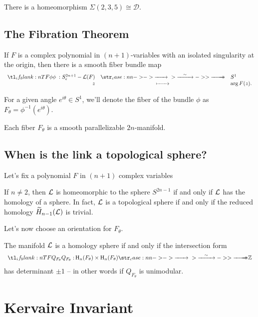 \begin{proposition}
	There is a homeomorphism $\Sigma(2,3,5)\cong \mathscr{D}$.
\end{proposition}

\subsection{The Fibration Theorem}

\begin{theorem}\label{thm:fibration}
	If $F$ is a complex polynomial in $(n+1)$-variables with an isolated singularity at the origin, then there is a smooth fiber bundle map
	\[
		\lkxfunc{\phi}{S^{2n+1}_\varepsilon - \L(F)}{S^1}{z}{\arg F(z).}
	\]
\end{theorem}

For a given angle $e^{i\theta}\in S^1$, we'll denote the fiber of the bundle $\phi$ as $F_\theta = \phi^{-1}(e^{i\theta})$.

\begin{proposition}
  Each fiber $F_\theta$ is a smooth parallelizable $2n$-manifold.
\end{proposition}

\subsection{When is the link a topological sphere?}

Let's fix a polynomial $F$ in $(n+1)$ complex variables

\begin{proposition}
  If $n\neq 2$, then $\mathcal{L}$ is homeomorphic to the sphere $S^{2n-1}$ if and only if $\mathcal{L}$ has the homology of a sphere. In fact, $\mathcal{L}$ is a topological sphere if and only if the reduced homology $\widetilde{H}_{n-1}(\mathcal{L})$ is trivial.
\end{proposition}

Let's now choose an orientation for $F_\theta$.

\begin{proposition}
  The manifold $\mathcal{L}$ is a homology sphere if and only if the intersection form
  \[
    \lkxfunc{Q_{F_\theta}}{\H_n(F_\theta)\times \H_n(F_\theta)}{\Z}
  \]
  has determinant $\pm 1$ -- in other words if $Q_{F_\theta}$ is unimodular.
\end{proposition}

\section{Kervaire Invariant}

